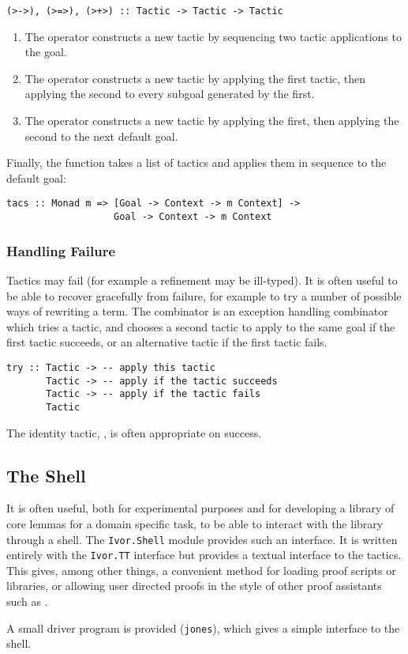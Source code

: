 \begin{verbatim}
(>->), (>=>), (>+>) :: Tactic -> Tactic -> Tactic
\end{verbatim}

\begin{enumerate}
\item The \hdecl{>->} operator constructs a new tactic by sequencing two
tactic applications to the  goal.

\item The \hdecl{>=>} operator constructs a new tactic by applying the first
tactic, then applying the second to every subgoal generated by the first.

\item The \hdecl{>+>} operator constructs a new tactic by applying the
  first, then applying the second to the next default goal.
\end{enumerate}

Finally, the  function takes a list of tactics and applies
them in sequence to the default goal:

\begin{verbatim}
tacs :: Monad m => [Goal -> Context -> m Context] -> 
                   Goal -> Context -> m Context
\end{verbatim}

\subsubsection{Handling Failure}

Tactics may fail (for example a refinement may be ill-typed). It is
often useful to be able to recover gracefully from failure, for
example to try a number of possible ways of rewriting a term.
The  combinator is an exception handling combinator which
tries a tactic, and chooses a second tactic to apply to the same goal
if the first tactic succeeds, or an alternative tactic if the first
tactic fails.

\begin{verbatim}
try :: Tactic -> -- apply this tactic
       Tactic -> -- apply if the tactic succeeds
       Tactic -> -- apply if the tactic fails
       Tactic
\end{verbatim}

The identity tactic, , is often appropriate on success.

\subsection{The Shell}

It is often useful, both for experimental purposes and for developing
a library of core lemmas for a domain specific task, to be able to
interact with the library through a shell. The \texttt{Ivor.Shell}
module provides such an interface. It is written entirely with the
\texttt{Ivor.TT} interface but provides a textual interface to the
tactics. This gives, among other things, a convenient method for
loading proof scripts or libraries, or allowing user directed proofs
in the style of other proof assistants such as \Coq{}.

A small driver program is provided (\texttt{jones}), which gives a
simple interface to the \Ivor{} shell.
